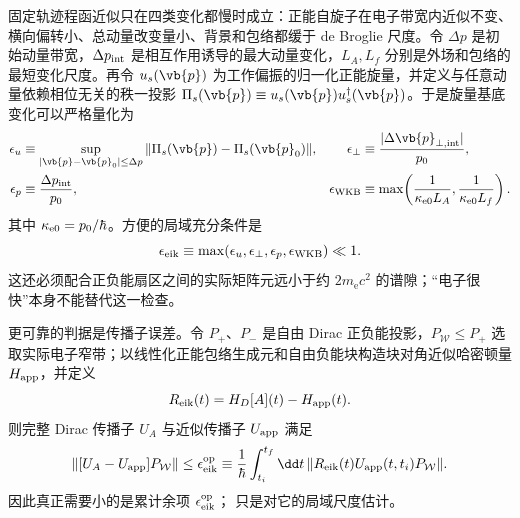 固定轨迹程函近似只在四类变化都慢时成立：正能自旋子在电子带宽内近似不变、横向偏转小、总动量改变量小、背景和包络都缓于 de Broglie 尺度。令 $\Delta p$ 是初始动量带宽，$\Delta p_{\rm int}$ 是相互作用诱导的最大动量变化，$L_A,L_f$ 分别是外场和包络的最短变化尺度。再令 $u_s(\vb{p})$ 为工作偏振的归一化正能旋量，并定义与任意动量依赖相位无关的秩一投影 $\Pi_s(\vb{p})\equiv u_s(\vb{p})u_s^\dagger(\vb{p})$。于是旋量基底变化可以严格量化为
\begin{align*}
\epsilon_u&\equiv
\sup_{|\vb{p}-\vb{p}_0|\le\Delta p}
\|\Pi_s(\vb{p})-\Pi_s(\vb{p}_0)\|,
&\epsilon_\perp&\equiv\frac{|\Delta\vb{p}_{\perp,{\rm int}}|}{p_0},\\
\epsilon_p&\equiv\frac{\Delta p_{\rm int}}{p_0},
&\epsilon_{\rm WKB}&\equiv\max\!\left(\frac1{\kappa_{\rm e0}L_A},\frac1{\kappa_{\rm e0}L_f}\right).
\end{align*}
其中 $\kappa_{\rm e0}=p_0/\hbar$。方便的局域充分条件是
\begin{equation}
{
\epsilon_{\rm eik}
\equiv\max(\epsilon_u,\epsilon_\perp,\epsilon_p,\epsilon_{\rm WKB})\ll1.}
\label{eq:general_eikonal_control_parameter}
\end{equation}
这还必须配合正负能扇区之间的实际矩阵元远小于约 $2m_{\mathrm e} c^2$ 的谱隙；“电子很快”本身不能替代这一检查。

更可靠的判据是传播子误差。令 $P_+$、$P_-$ 是自由 Dirac 正负能投影，$P_{\mathcal W}\le P_+$ 选取实际电子窄带；以线性化正能包络生成元和自由负能块构造块对角近似哈密顿量$H_{\rm app}$，并定义
\begin{equation*}
R_{\rm eik}(t)=H_D[A](t)-H_{\rm app}(t).
\end{equation*}
则完整 Dirac 传播子 $U_A$ 与近似传播子 $U_{\rm app}$ 满足
\begin{equation}
{
\|[U_A-U_{\rm app}]P_{\mathcal W}\|
\le
\epsilon_{\rm eik}^{\rm op}
\equiv\frac1\hbar\int_{t_i}^{t_f}\dd t\,
\|R_{\rm eik}(t)U_{\rm app}(t,t_i)P_{\mathcal W}\|.}
\label{eq:eikonal_duhamel_error_bound}
\end{equation}
因此真正需要小的是累计余项 $\epsilon_{\rm eik}^{\rm op}$； 只是对它的局域尺度估计。


